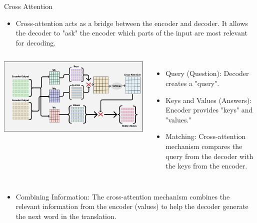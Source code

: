 \documentclass{beamer}
\begin{document}
\begin{frame}{Cross Attention}

\begin{itemize}
    \item  Cross-attention acts as a bridge between the encoder and decoder. It allows the decoder to "ask" the encoder which parts of the input are most relevant for decoding.
\end{itemize}


\begin{columns}
        \vspace{2em} %
        \includegraphics[width=1.2\linewidth]{f17.png}
        \renewcommand{\thefootnote}{}

    \vspace{-1em}
    \begin{itemize}
        \item Query (Question): Decoder creates a "query".
        \item Keys and Values (Answers): Encoder provides "keys" and "values." 
        \item Matching: Cross-attention mechanism compares the query from the decoder with the keys from the encoder. 
    \end{itemize}
\end{columns}

\begin{itemize}
    \item Combining Information: The cross-attention mechanism combines the relevant information from the encoder (values) to help the decoder generate the next word in the translation.
\end{itemize}
\end{frame}
\end{document}
